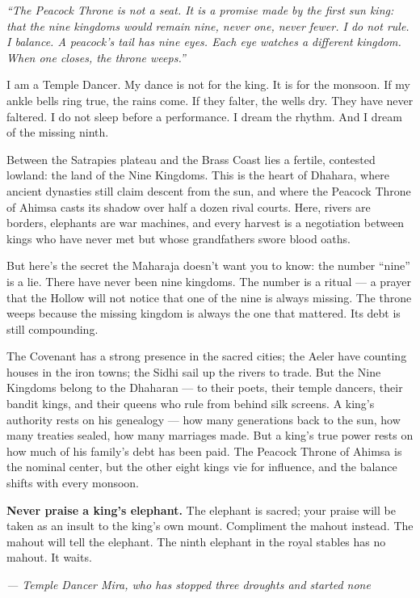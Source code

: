 \noindent
{\Large
\textit{``The Peacock Throne is not a seat. It is a promise made by the first sun king: that the nine kingdoms would remain nine, never one, never fewer. I do not rule. I balance. A peacock's tail has nine eyes. Each eye watches a different kingdom. When one closes, the throne weeps.''}

\vspace{0.5em}

I am a Temple Dancer. My dance is not for the king. It is for the monsoon. If my ankle bells ring true, the rains come. If they falter, the wells dry. They have never faltered. I do not sleep before a performance. I dream the rhythm. And I dream of the missing ninth.

\vspace{0.5em}

Between the Satrapies plateau and the Brass Coast lies a fertile, contested lowland: the land of the Nine Kingdoms. This is the heart of Dhahara, where ancient dynasties still claim descent from the sun, and where the Peacock Throne of Ahimsa casts its shadow over half a dozen rival courts. Here, rivers are borders, elephants are war machines, and every harvest is a negotiation between kings who have never met but whose grandfathers swore blood oaths.

But here's the secret the Maharaja doesn't want you to know: the number ``nine'' is a lie. There have never been nine kingdoms. The number is a ritual --- a prayer that the Hollow will not notice that one of the nine is always missing. The throne weeps because the missing kingdom is always the one that mattered. Its debt is still compounding.

\vspace{0.5em}

The Covenant has a strong presence in the sacred cities; the Aeler have counting houses in the iron towns; the Sidhi sail up the rivers to trade. But the Nine Kingdoms belong to the Dhaharan --- to their poets, their temple dancers, their bandit kings, and their queens who rule from behind silk screens. A king's authority rests on his genealogy --- how many generations back to the sun, how many treaties sealed, how many marriages made. But a king's true power rests on how much of his family's debt has been paid. The Peacock Throne of Ahimsa is the nominal center, but the other eight kings vie for influence, and the balance shifts with every monsoon.

\vspace{0.5em}

\textbf{Never praise a king's elephant.} The elephant is sacred; your praise will be taken as an insult to the king's own mount. Compliment the mahout instead. The mahout will tell the elephant. The ninth elephant in the royal stables has no mahout. It waits.

\vspace{1em}

\noindent\textit{--- Temple Dancer Mira, who has stopped three droughts and started none}
}

